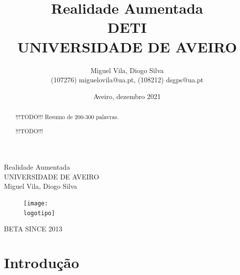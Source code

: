 \documentclass{report}
\begin{document}
\def\titulo{Realidade Aumentada}
\def\data{Aveiro, dezembro 2021}
\def\autores{Miguel Vila, Diogo Silva}
\def\autorescontactos{(107276) miguelovila@ua.pt, (108212) dsgps@ua.pt}
\def\versao{BETA SINCE 2013}
\def\departamento{DETI}
\def\empresa{UNIVERSIDADE DE AVEIRO}
\def\logotipo{ua.pdf}

\begin{titlepage}
\begin{center}
\vspace*{50mm}
{\Huge \titulo}\\ 
\vspace{10mm}
{\Large \empresa}\\
\vspace{10mm}
{\LARGE \autores}\\ 
\vspace{30mm}
\begin{figure}[h]
\center
\texttt{[image: \\logotipo]}
\end{figure}
\vspace{30mm}
\end{center}
\begin{flushright}
\versao
\end{flushright}
\end{titlepage}

\title{%
{\Huge\textbf{\titulo}}\\
{\Large \departamento\\ \empresa}
}
\author{
    \autores \\
    \autorescontactos
}
\date{\data}
\maketitle
{}

\begin{abstract}
!!!TODO!!! Resumo de 200-300 palavras.
\end{abstract}

\renewcommand{\abstractname}{Agradecimentos}
\begin{abstract}
!!!TODO!!!
\end{abstract}

\tableofcontents
\listoftables
\listoffigures

\clearpage
{}

\chapter{Introdução}
\label{chap.introducao}
\end{document}
